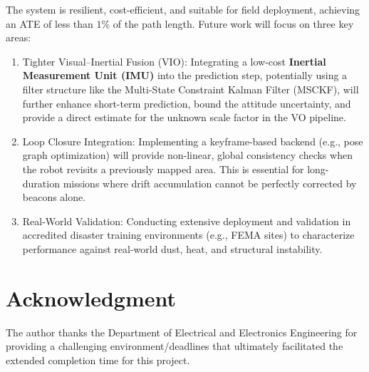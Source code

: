 \documentclass[conference]{IEEEtran}
\begin{document}
The system is resilient, cost-efficient, and suitable for field deployment, achieving an ATE of less than $1\%$ of the path length. Future work will focus on three key areas:

\begin{enumerate}
    \item Tighter Visual–Inertial Fusion (VIO): Integrating a low-cost \textbf{Inertial Measurement Unit (IMU)} into the prediction step, potentially using a filter structure like the Multi-State Constraint Kalman Filter (MSCKF), will further enhance short-term prediction, bound the attitude uncertainty, and provide a direct estimate for the unknown scale factor in the VO pipeline.
    \item Loop Closure Integration: Implementing a keyframe-based backend (e.g., pose graph optimization) will provide non-linear, global consistency checks when the robot revisits a previously mapped area. This is essential for long-duration missions where drift accumulation cannot be perfectly corrected by beacons alone.
    \item Real-World Validation: Conducting extensive deployment and validation in accredited disaster training environments (e.g., FEMA sites) to characterize performance against real-world dust, heat, and structural instability.
\end{enumerate}

\section*{Acknowledgment}
The author thanks the Department of Electrical and Electronics Engineering for providing a challenging environment/deadlines that ultimately facilitated the extended completion time for this project. 
\end{document}
